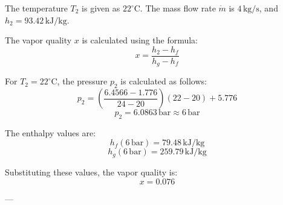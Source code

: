 The temperature \( T_2 \) is given as \( 22^\circ\text{C} \). The mass flow rate \( \dot{m} \) is \( 4 \, \text{kg/s} \), and \( h_2 = 93.42 \, \text{kJ/kg} \).  

The vapor quality \( x \) is calculated using the formula:  
\[
x = \frac{h_2 - h_f}{h_g - h_f}
\]  

For \( T_2 = 22^\circ\text{C} \), the pressure \( p_2 \) is calculated as follows:  
\[
p_2 = \left( \frac{6.4566 - 1.776}{24 - 20} \right)(22 - 20) + 5.776
\]  
\[
p_2 = 6.0863 \, \text{bar} \approx 6 \, \text{bar}
\]  

The enthalpy values are:  
\[
h_f(6 \, \text{bar}) = 79.48 \, \text{kJ/kg}
\]  
\[
h_g(6 \, \text{bar}) = 259.79 \, \text{kJ/kg}
\]  

Substituting these values, the vapor quality is:  
\[
x = 0.076
\]  

---